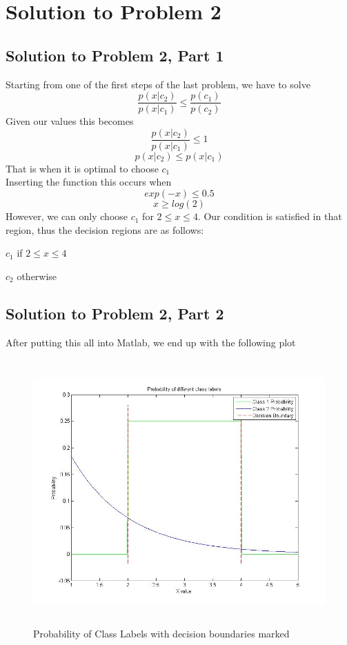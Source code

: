 \documentclass[11pt,psfig]{article}
\begin{document}
\newpage

\section*{Solution to Problem 2}		
\subsection*{Solution to Problem 2, Part 1}

Starting from one of the first steps of the last problem, we have to solve
\[
\frac{p(x|c_2)}{p(x|c_1)} \leq \frac{p(c_1)}{p(c_2)}
\]
Given our values this becomes
\[
\frac{p(x|c_2)}{p(x|c_1)} \leq 1
\]
\[
p(x|c_2) \leq p(x|c_1)
\]
That is when it is optimal to choose $c_1$ \\
Inserting the function this occurs when
\[
exp(-x) \leq 0.5
\]
\[
x \geq log(2)
\]
However, we can only choose $c_1$ for $2 \leq x \leq 4$. Our condition is satisfied in that region, thus the decision regions are as follows:

$c_1$ if $2 \leq x \leq 4$

$c_2$ otherwise

\subsection*{Solution to Problem 2, Part 2}

After putting this all into Matlab, we end up with the following plot
\begin{figure}[H]
\centering
\includegraphics[height=4in]{prob2plot.jpg}
\caption{Probability of Class Labels with decision boundaries marked}
\end{figure}
\end{document}
